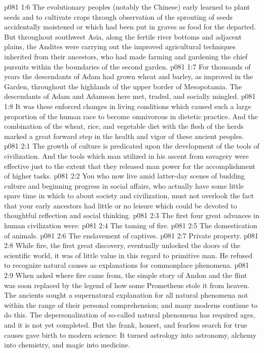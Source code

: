\vs p081 1:6 The evolutionary peoples (notably the Chinese) early learned to plant seeds and to cultivate crops through observation of the sprouting of seeds accidentally moistened or which had been put in graves as food for the departed. But throughout southwest Asia, along the fertile river bottoms and adjacent plains, the Andites were carrying out the improved agricultural techniques inherited from their ancestors, who had made farming and gardening the chief pursuits within the boundaries of the second garden.
\vs p081 1:7 For thousands of years the descendants of Adam had grown wheat and barley, as improved in the Garden, throughout the highlands of the upper border of Mesopotamia. The descendants of Adam and Adamson here met, traded, and socially mingled.
\vs p081 1:8 It was these enforced changes in living conditions which caused such a large proportion of the human race to become omnivorous in dietetic practice. And the combination of the wheat, rice, and vegetable diet with the flesh of the herds marked a great forward step in the health and vigor of these ancient peoples.
\vs p081 2:1 The growth of culture is predicated upon the development of the tools of civilization. And the tools which man utilized in his ascent from savagery were effective just to the extent that they released man power for the accomplishment of higher tasks.
\vs p081 2:2 You who now live amid latter\hyp{}day scenes of budding culture and beginning progress in social affairs, who actually have some little spare time in which to  about society and civilization, must not overlook the fact that your early ancestors had little or no leisure which could be devoted to thoughtful reflection and social thinking.
\vs p081 2:3 \pc The first four great advances in human civilization were:
\vs p081 2:4 \bibnobreakspace The taming of fire.
\vs p081 2:5 \bibnobreakspace The domestication of animals.
\vs p081 2:6 \bibnobreakspace The enslavement of captives.
\vs p081 2:7 \bibnobreakspace Private property.
\vs p081 2:8 \pc While fire, the first great discovery, eventually unlocked the doors of the scientific world, it was of little value in this regard to primitive man. He refused to recognize natural causes as explanations for commonplace phenomena.
\vs p081 2:9 When asked where fire came from, the simple story of Andon and the flint was soon replaced by the legend of how some Prometheus stole it from heaven. The ancients sought a supernatural explanation for all natural phenomena not within the range of their personal comprehension; and many moderns continue to do this. The depersonalization of so\hyp{}called natural phenomena has required ages, and it is not yet completed. But the frank, honest, and fearless search for true causes gave birth to modern science: It turned astrology into astronomy, alchemy into chemistry, and magic into medicine.
